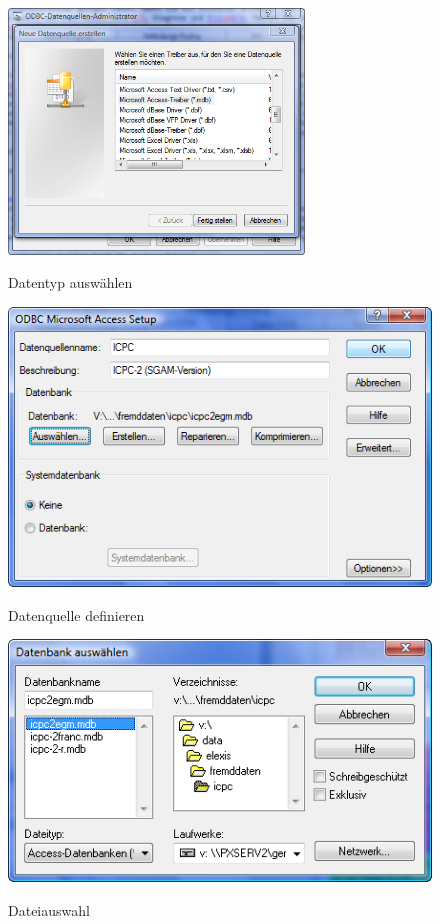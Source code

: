 \documentclass[a4paper]{scrartcl}
\begin{document}
\begin{figure}
  \center
  \includegraphics[width=0.7\textwidth]{icpc6}\\
  \caption{Datentyp auswählen}\label{fig:odbc2}
\end{figure}

\begin{figure}
  \includegraphics{icpc8}\\
  \caption{Datenquelle definieren}\label{fig:odbc3}
\end{figure}

\begin{figure}
  \includegraphics{icpc7}\\
  \caption{Dateiauswahl}\label{fig:odbc4}
\end{figure}
\end{document}
